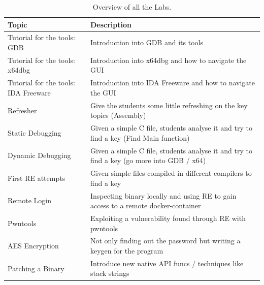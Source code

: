 \begin{center}
    \begin{table}[H]
        \centering
        \begin{tabular}{ |p{4.1cm}|p{10cm}| } 
            \hline
                Topic & 
                Description \\ [0.5ex] 
            \hline
            \hline
                Tutorial for the tools: GDB & Introduction into GDB and its tools \\
            \hline
                Tutorial for the tools: x64dbg & Introduction into x64dbg and how to navigate the GUI \\
            \hline
                Tutorial for the tools: IDA Freeware & Introduction into IDA Freeware and how to navigate the GUI \\
            \hline
                Refresher & 
                Give the students some little refreshing on the key topics (Assembly)  \\ 
            \hline
                Static Debugging & 
                Given a simple C file, students analyse it and try to find a key (Find Main function) \\ 
            \hline
                Dynamic Debugging & 
                Given a simple C file, students analyse it and try to find a key (go more into GDB / x64) \\ 
            \hline
                First RE attempts & 
                Given simple files compiled in different compilers to find a key \\ 
            \hline
                Remote Login  & 
                Inspecting binary locally and using RE to gain access to a remote docker-container \\
            \hline
                Pwntools & 
                Exploiting a vulnerability found through RE with pwntools \\
            \hline
                AES Encryption & 
                Not only finding out the password but writing a keygen for the program \\
            \hline
                Patching a Binary & 
                Introduce new native API funcs / techniques like stack strings \\
            \hline
        \end{tabular}
        \caption{Overview of all the Labs.}
        \label{tab:labs}
    \end{table}
\end{center}
